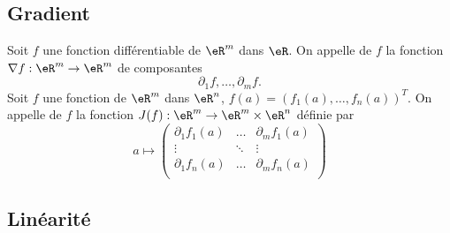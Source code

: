 

\subsection{Gradient}

\begin{definition}
	Soit \( f\) une fonction différentiable de \( \eR^m\) dans \( \eR\). On appelle  de \( f\) la fonction \( \nabla f : \eR^m\to \eR^m\) de composantes
	\[
		\partial_{1}f,\ldots,\partial_{m}f.
	\]
	Soit \( f\) une fonction de \( \eR^m\) dans \( \eR^n\), \( f(a)=(f_1(a),\ldots,f_n(a))^T\). On appelle  de \( f\) la fonction \( J(f) : \eR^m\to \eR^m\times\eR^n\) définie par
	\begin{equation}
		a\mapsto  \begin{pmatrix}
			\partial_{1}f_1(a)  & \ldots & \partial_{m}f_1(a) \\
			\vdots              & \ddots & \vdots             \\
			\partial_{1}f_n (a) & \ldots & \partial_{m}f_n(a) \\
		\end{pmatrix}
	\end{equation}
\end{definition}

\subsection{Linéarité}

